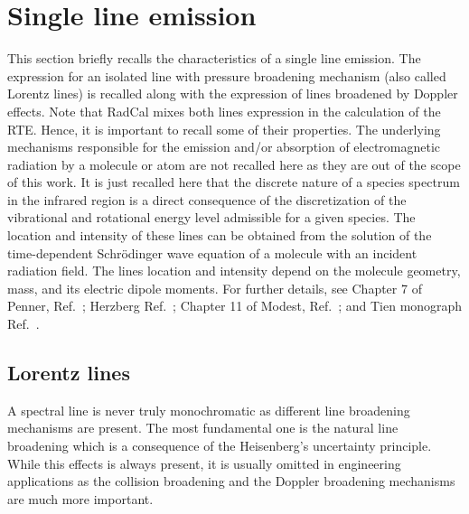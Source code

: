\section{Single line emission}
This section briefly recalls the characteristics of a single line emission. The expression for an isolated line with pressure broadening mechanism (also called Lorentz lines) is recalled along with the expression of lines broadened by Doppler effects. Note that RadCal mixes both lines expression in the calculation of the RTE. Hence, it is important to recall some of their properties. The underlying mechanisms responsible for the emission and/or absorption of electromagnetic radiation by a molecule or atom are not recalled here as they are out of the scope of this work. It is just recalled here that the discrete nature of a species spectrum in the infrared region is a direct consequence of the discretization of the vibrational and rotational energy level admissible for a given species. The location and intensity of these lines can be obtained from the solution of the time-dependent Schr\"{o}dinger wave equation of a molecule with an incident radiation field. The lines location and intensity depend on the molecule geometry, mass, and its electric dipole moments. For further details, see Chapter 7 of Penner, Ref.~\cite{Penner1959}; Herzberg Ref.~\cite{Herzberg1949}; Chapter 11 of Modest, Ref.~\cite{Modest2013}; and Tien monograph Ref.~\cite{Tien1968}.

\subsection{Lorentz lines}
A spectral line is never truly monochromatic as different line broadening mechanisms are present. The most fundamental one is the natural line broadening which is a consequence of the Heisenberg's uncertainty principle. While this effects is always present, it is usually omitted in engineering applications as the collision broadening and the Doppler broadening mechanisms are much more important.

